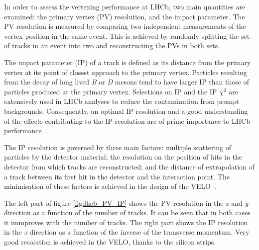In order to assess the vertexing performance at LHCb, two main quantities are examined: the primary vertex (PV) resolution, and the impact parameter. The PV resolution is measured by comparing two independent measurements of the vertex position in the same event. This is achieved by randomly splitting the set of tracks in an event into two and reconstructing the PVs in both sets. 

The impact parameter (IP) of a track is defined as its distance from the primary vertex
at its point of closest approach to the primary vertex. Particles resulting from the decay
of long lived \textit{B} or \textit{D} mesons tend to have larger IP than those of particles produced at the primary vertex. Selections on IP and the IP $\chi^2$ are extensively used in LHCb analyses to reduce the contamination from prompt backgrounds. Consequently, an optimal IP resolution and a good understanding of the effects contributing to the IP resolution are of prime importance to LHCb performance~\cite{Aaij:2014jba}.

The IP resolution is governed by three main factors: multiple scattering of particles by
the detector material; the resolution on the position of hits in the detector from which
tracks are reconstructed; and the distance of extrapolation of a track between its first hit in the detector and the interaction point. The minimisation of these factors is achieved in the design of the VELO~\cite{Aaij:2014jba}. %

The left part of figure \ref{fig:lhcb_PV_IP} shows the PV resolution in the \textit{x} and \textit{y} direction as a function of the number of tracks. It can be seen that in both cases it immproves with the number of tracks. The right part shows the IP resolution in the \textit{x} direction as a function of the inverse of the transverse momentum. Very good resolution is achieved in the VELO, thanks to the silicon strips. 


